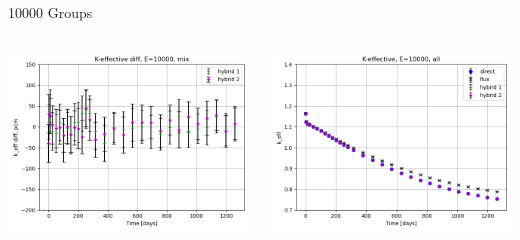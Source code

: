 \documentclass[
	11pt, %
	aspectratio=169, %
]{beamer}
\begin{document}
\begin{frame}{10000 Groups}
\begin{columns}[c]
\begin{column}{0.32\textwidth}
			\includegraphics[width=\textwidth]{../figures/keff/keff_mix_10000_diff.png}
		\end{column}
		\begin{column}{0.32\textwidth} %
			\includegraphics[width=\textwidth]{../figures/keff/keff_all_10000.png}


\end{column}
\end{columns}
\end{frame}
\end{document}
